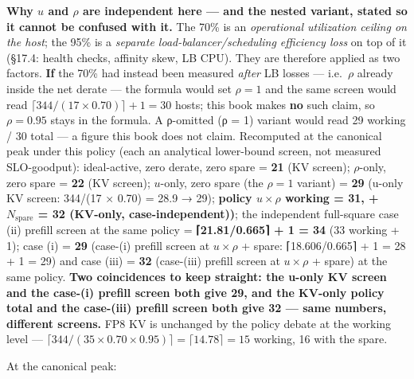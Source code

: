 \textbf{Why \(u\) and \(\rho\) are independent here --- and the nested
variant, stated so it cannot be confused with it.} The 70\% is an
\emph{operational utilization ceiling on the host}; the 95\% is a
\emph{separate load-balancer/scheduling efficiency loss} on top of it
(§17.4: health checks, affinity skew, LB CPU). They are therefore
applied as two factors. \textbf{If} the 70\% had instead been measured
\emph{after} LB losses --- i.e.~\(\rho\) already inside the net derate
--- the formula would set \(\rho = 1\) and the same screen would read
\(\lceil 344/(17 \times 0.70)\rceil + 1 = 30\) hosts; this book makes
\textbf{no} such claim, so \(\rho = 0.95\) stays in the formula. A
ρ-omitted (ρ = 1) variant would read 29 working / 30 total --- a figure
this book does not claim. Recomputed at the canonical peak under this
policy (each an analytical lower-bound screen, not measured
SLO-goodput): ideal-active, zero derate, zero spare = \textbf{21} (KV
screen); \(\rho\)-only, zero spare = \textbf{22} (KV screen);
\(u\)-only, zero spare (the \(\rho = 1\) variant) = \textbf{29} (u-only
KV screen: 344/(17 × 0.70) = 28.9 → 29); \textbf{policy
\(u \times \rho\) working = 31, + \(N_\text{spare}\) = 32 (KV-only,
case-independent))}; the independent full-square case (ii) prefill
screen at the same policy = \textbf{⌈21.81/0.665⌉ + 1 = 34} (33 working
+ 1); case (i) = \textbf{29} (case-(i) prefill screen at
\(u \times \rho\) + spare: ⌈18.606/0.665⌉ + 1 = 28 + 1 = 29) and case
(iii) = \textbf{32} (case-(iii) prefill screen at \(u \times \rho\) +
spare) at the same policy. \textbf{Two coincidences to keep straight:
the u-only KV screen and the case-(i) prefill screen both give 29, and
the KV-only policy total and the case-(iii) prefill screen both give 32
--- same numbers, different screens.} FP8 KV is unchanged by the policy
debate at the working level ---
\(\lceil 344/(35 \times 0.70 \times 0.95) \rceil = \lceil 14.78 \rceil = 15\)
working, 16 with the spare.

At the canonical peak:

